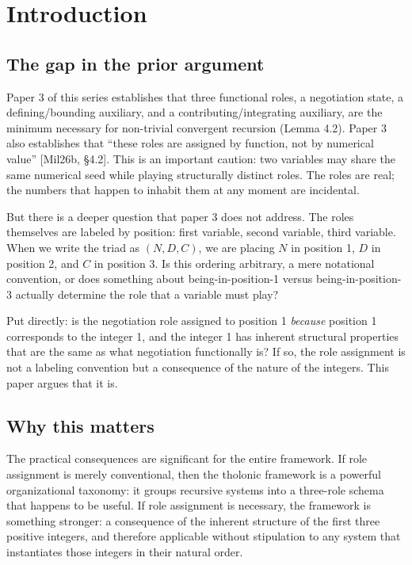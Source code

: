 \documentclass[12pt]{article}
\begin{document}
\section{Introduction}\label{introduction}

\subsection{The gap in the prior argument}\label{the-gap-in-the-prior-argument}

Paper 3 of this series establishes that three functional roles, a
negotiation state, a defining/bounding auxiliary, and a
contributing/integrating auxiliary, are the minimum necessary for
non-trivial convergent recursion (Lemma 4.2). Paper 3 also establishes
that ``these roles are assigned by function, not by numerical value''
{[}Mil26b, §4.2{]}. This is an important caution: two variables may
share the same numerical seed while playing structurally distinct roles.
The roles are real; the numbers that happen to inhabit them at any
moment are incidental.

But there is a deeper question that paper 3 does not address. The roles
themselves are labeled by position: first variable, second variable,
third variable. When we write the triad as \((N, D, C)\), we are placing
\(N\) in position 1, \(D\) in position 2, and \(C\) in position 3. Is
this ordering arbitrary, a mere notational convention, or does something
about being-in-position-1 versus being-in-position-3 actually determine
the role that a variable must play?

Put directly: is the negotiation role assigned to position 1
\emph{because} position 1 corresponds to the integer 1, and the integer
1 has inherent structural properties that are the same as what
negotiation functionally is? If so, the role assignment is not a
labeling convention but a consequence of the nature of the integers.
This paper argues that it is.

\subsection{Why this matters}\label{why-this-matters}

The practical consequences are significant for the entire framework. If
role assignment is merely conventional, then the tholonic framework is a
powerful organizational taxonomy: it groups recursive systems into a
three-role schema that happens to be useful. If role assignment is
necessary, the framework is something stronger: a consequence of the
inherent structure of the first three positive integers, and therefore
applicable without stipulation to any system that instantiates those
integers in their natural order.
\end{document}
